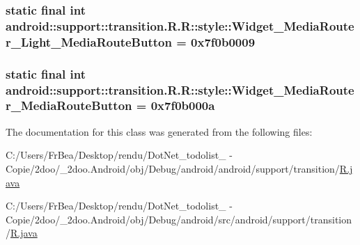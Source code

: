 \hypertarget{classandroid_1_1support_1_1transition_1_1_r_1_1style_afc54ef1d5558233d88424875d0263a2}{
\subsubsection[{Widget\_\-MediaRouter\_\-Light\_\-MediaRouteButton}]{\setlength{\rightskip}{0pt plus 5cm}static final int android::support::transition.R.R::style::Widget\_\-MediaRouter\_\-Light\_\-MediaRouteButton = 0x7f0b0009}}
\label{classandroid_1_1support_1_1transition_1_1_r_1_1style_afc54ef1d5558233d88424875d0263a2}


\hypertarget{classandroid_1_1support_1_1transition_1_1_r_1_1style_eeeb72fefb1a7623f50cb8610cfd9c2f}{
\subsubsection[{Widget\_\-MediaRouter\_\-MediaRouteButton}]{\setlength{\rightskip}{0pt plus 5cm}static final int android::support::transition.R.R::style::Widget\_\-MediaRouter\_\-MediaRouteButton = 0x7f0b000a}}
\label{classandroid_1_1support_1_1transition_1_1_r_1_1style_eeeb72fefb1a7623f50cb8610cfd9c2f}




The documentation for this class was generated from the following files:\begin{CompactItemize}
\item 
C:/Users/FrBea/Desktop/rendu/DotNet\_\-todolist\_ - Copie/2doo/\_\-2doo.Android/obj/Debug/android/android/support/transition/\hyperlink{android_2support_2transition_2_r_8java}{R.java}\item 
C:/Users/FrBea/Desktop/rendu/DotNet\_\-todolist\_ - Copie/2doo/\_\-2doo.Android/obj/Debug/android/src/android/support/transition/\hyperlink{src_2android_2support_2transition_2_r_8java}{R.java}\end{CompactItemize}

